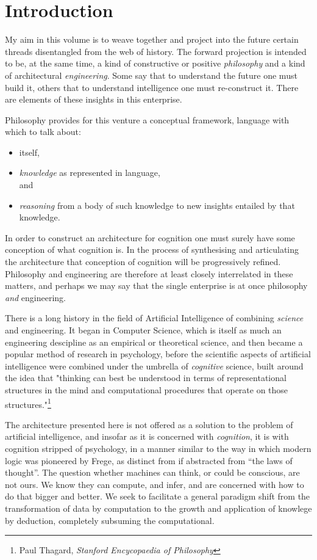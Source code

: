 

\chapter{Introduction}\label{Introduction}

My aim in this volume is to weave together and project into the future certain threads disentangled from the web of history.
The forward projection is intended to be, at the same time, a kind of constructive or positive {\it philosophy} and a kind of architectural {\it engineering}.
Some say that to understand the future one must build it, others that to understand intelligence one must re-construct it.
There are elements of these insights in this enterprise.

Philosophy provides for this venture a conceptual framework, language with which to talk about:
\begin{itemize}
\item {} itself,
\item {\it knowledge} as represented in language,\\
  and
\item {\it reasoning} from a body of such knowledge to new insights entailed by that knowledge.
\end{itemize}

In order to construct an architecture for cognition one must surely have some conception of what cognition is.
In the process of synthesising and articulating the architecture that conception of cognition will be progressively refined.
Philosophy and engineering are therefore at least closely interrelated in these matters, and perhaps we may say that the single enterprise is at once philosophy {\it and} engineering.

There is a long history in the field of Artificial Intelligence of combining {\it science} and engineering.
It began in Computer Science, which is itself as much an engineering descipline as an empirical or theoretical science, and then became a popular method of research in psychology, before the scientific aspects of artificial intelligence were combined under the umbrella of {\it cognitive} science, built around the idea that "thinking can best be understood in terms of representational structures in the mind and computational procedures that operate on those structures."\footnote{Paul Thagard, \it Stanford Encycopaedia of Philosophy}

The architecture presented here is not offered as a solution to the problem of artificial intelligence,
and insofar as it is concerned with {\it cognition}, it is with cognition stripped of psychology, in a manner similar to the way in which modern logic was pioneered by Frege, as distinct from if abstracted from ``the laws of thought''.
The question whether machines can think, or could be conscious, are not ours.
We know they can compute, and infer, and are concerned with how to do that bigger and better.
We seek to facilitate a general paradigm shift from the transformation of data by computation to the growth and application of knowlege by deduction, completely subsuming the computational.

